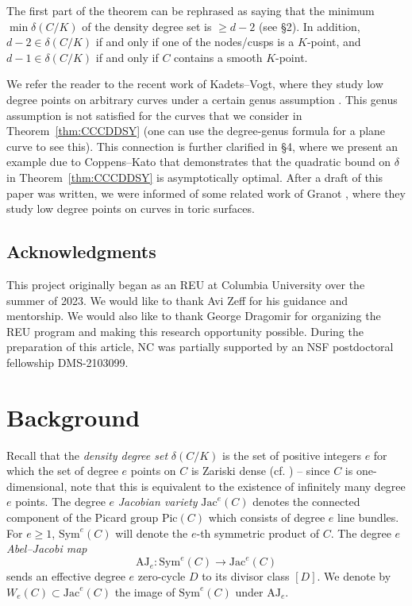 \documentclass[fontsize=11pt,reqno]{amsart}
\theoremstyle{definition}
\theoremstyle{remark}
\newcommand{\Sym}{\mathrm{Sym}}
\newcommand{\Jac}{\mathrm{Jac}}
\begin{document}
\noindent The first part of the theorem can be rephrased as saying that the minimum $\min \delta(C/K)$ of the density degree set is $\geq d-2$ (see \S2). In addition, $d-2 \in \delta(C/K)$ if and only if one of the nodes/cusps is a $K$-point, and $d-1 \in \delta(C/K)$ if and only if $C$ contains a smooth $K$-point.

We refer the reader to the recent work of Kadets--Vogt, where they study low degree points on arbitrary curves under a certain genus assumption \cite{KV25}. This genus assumption is not satisfied for the curves that we consider in Theorem~\ref{thm:CCCDDSY} (one can use the degree-genus formula for a plane curve to see this). This connection is further clarified in \S4, where we present an example due to Coppens--Kato that demonstrates that the quadratic bound on $\delta$ in Theorem~\ref{thm:CCCDDSY} is asymptotically optimal. After a draft of this paper was written, we were informed of some related work of Granot \cite{Granot2025}, where they study low degree points on curves in toric surfaces.

\subsection*{Acknowledgments}
This project originally began as an REU at Columbia University over the summer of 2023. We would like to thank Avi Zeff for his guidance and mentorship. We would also like to thank George Dragomir for organizing the REU program and making this research opportunity possible. During the preparation of this article, NC was partially supported by an NSF postdoctoral fellowship DMS-2103099.




\section{Background}\label{Section:Background}

Recall that the \textit{density degree set} $\delta(C/K)$ is the set of positive integers $e$ for which the set of degree $e$ points on $C$ is Zariski dense (cf. \cite[\S 2]{VV24}) -- since $C$ is one-dimensional, note that this is equivalent to the existence of infinitely many degree $e$ points. The degree $e$ \textit{Jacobian variety} $\Jac^{e}(C)$ denotes the connected component of the Picard group $\mathrm{Pic}(C)$ which consists of degree $e$ line bundles. For $e \geq 1$, $\Sym^{e}(C)$ will denote the $e$-th symmetric product of $C$. The degree $e$ \textit{Abel--Jacobi map}
\[ \mathrm{AJ}_{e}: \Sym^e(C) \to \Jac^e(C) \]
sends an effective degree $e$ zero-cycle $D$ to its divisor class $[D]$. We denote by $W_e(C) \subset \Jac^e(C)$ the image of $\Sym^e(C)$ under $\mathrm{AJ}_{e}$.
\end{document}
